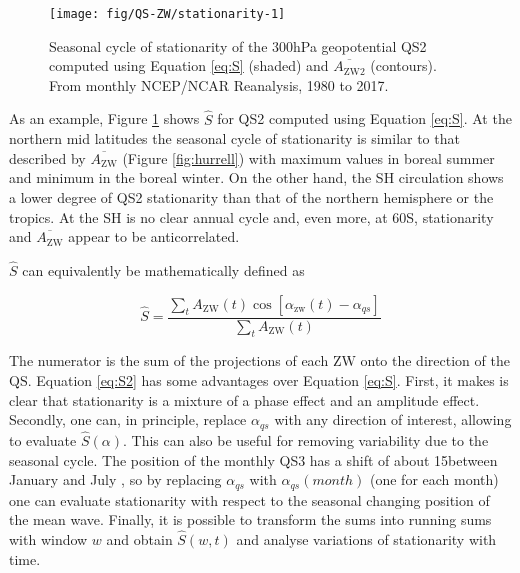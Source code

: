 \documentclass[draft,linenumbers]{agujournal2018}
\begin{document}
\begin{figure}[h]

{\centering \texttt{[image: fig/QS-ZW/stationarity-1]} 

}

\caption{Seasonal cycle of stationarity of the 300hPa geopotential QS2 computed using Equation \ref{eq:S} (shaded) and $\overline{A_\mathrm{ZW2}}$ (contours). From monthly NCEP/NCAR Reanalysis, 1980 to 2017.}\label{fig:stationarity}
\end{figure}

As an example, Figure \ref{fig:stationarity} shows \(\hat{S}\) for QS2
computed using Equation \ref{eq:S}. At the northern mid latitudes the
seasonal cycle of stationarity is similar to that described by
\(\overline{A_\mathrm{ZW}}\) (Figure \ref{fig:hurrell}) with maximum
values in boreal summer and minimum in the boreal winter. On the other
hand, the SH circulation shows a lower degree of QS2 stationarity than
that of the northern hemisphere or the tropics. At the SH is no clear
annual cycle and, even more, at 60\degree S, stationarity and
\(\overline{A_\mathrm{ZW}}\) appear to be anticorrelated.

\(\hat{S}\) can equivalently be mathematically defined as

\begin{linenomath*}
\begin{equation}\label{eq:S2}
\hat{S} =   \frac{\sum_t A_\mathrm{ZW}(t) \cos  \left [\alpha_\mathrm{zw}(t) - \alpha_{qs} \right ]}{\sum_t A_\mathrm{ZW}(t)}
\end{equation}
\end{linenomath*}

The numerator is the sum of the projections of each \(\mathrm{ZW}\) onto
the direction of the \(\mathrm{QS}\). Equation \ref{eq:S2} has some
advantages over Equation \ref{eq:S}. First, it makes is clear that
stationarity is a mixture of a phase effect and an amplitude effect.
Secondly, one can, in principle, replace \(\alpha_{qs}\) with any
direction of interest, allowing to evaluate \(\hat{S}(\alpha)\). This
can also be useful for removing variability due to the seasonal cycle.
The position of the monthly QS3 has a shift of about 15\degree between
January and July \citep{Loon1972}, so by replacing \(\alpha_{qs}\) with
\(\alpha_{qs}(month)\) (one for each month) one can evaluate
stationarity with respect to the seasonal changing position of the mean
wave. Finally, it is possible to transform the sums into running sums
with window \(w\) and obtain \(\hat{S}(w, t)\) and analyse variations of
stationarity with time.
\end{document}
